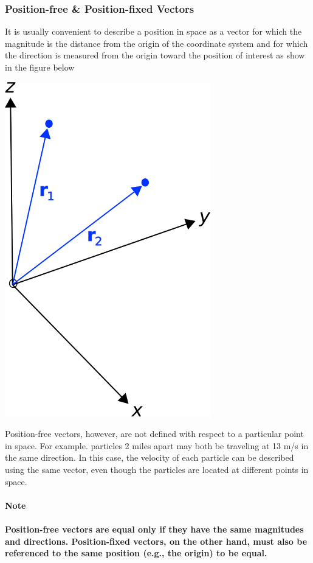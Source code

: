 \documentclass[12pt,addpoints]{exam}
\begin{document}
	\subsubsection*{Position-free \& Position-fixed Vectors}
	It is usually convenient to describe a position in space as a vector for which the magnitude is the distance from the origin of the coordinate system and for which the direction is measured from the origin toward the position of interest as show in the figure below
	\begin{center}
		\includegraphics[scale=0.85]{PositionFixed.png}
	\end{center}
	Position-free vectors, however, are not defined with respect to a particular point in space. For example. particles 2 miles apart may both be traveling at 13 m/s in the same direction. In this case, the velocity of each particle can be described using the same vector, even though the particles are located at different points in space. \\ \\
	\textbf{Note} \\ \\
	\textbf{	Position-free vectors are equal only if they have the same magnitudes and directions. Position-fixed vectors, on the other hand, must also be referenced to the same position (e.g., the origin) to be equal.}
\end{document}
